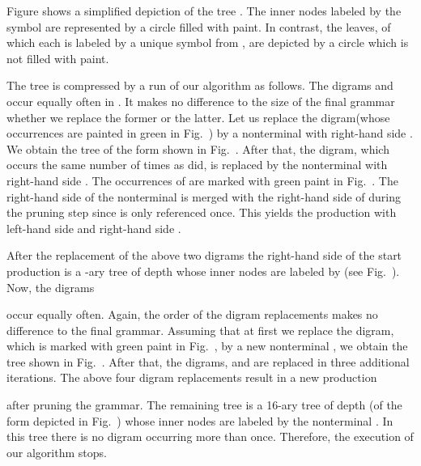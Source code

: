 \documentclass[12pt]{llncs}
\newcommand{\tp}{digram\xspace}
\newcommand{\tps}{digrams\xspace}
\begin{document}
\begin{example}\label{ex:unlimitedRank1}
	Figure  shows a simplified depiction of the tree . The inner nodes labeled by the symbol  are represented by a circle filled with paint. In contrast, the leaves, of which each is labeled by a unique symbol from , are depicted by a circle which is not filled with paint. 
	
	The tree  is compressed by a run of our algorithm as follows. The \tps  and  occur equally often in . It makes no difference to the size of the final grammar whether we replace the former or the latter. Let us replace the \tp  (whose occurrences are painted in green in Fig.~) by a nonterminal  with right-hand side . We obtain the tree of the form shown in Fig.~. After that, the \tp , which occurs the same number of times as  did, is replaced by the nonterminal  with right-hand side . The occurrences of  are marked with green paint in Fig.~. The right-hand side of the nonterminal  is merged with the right-hand side of  during the pruning step since  is only referenced once. This yields the production with left-hand side  and right-hand side . 
	
	After the replacement of the above two \tps the right-hand side of the start production is a -ary tree of depth  whose inner nodes are labeled by  (see Fig.~).
	Now, the \tps
	 
	occur equally often. Again, the order of the \tp replacements makes no difference to the final grammar. Assuming that at first we replace the \tp , which is marked with green paint in Fig.~, by a new nonterminal , we obtain the tree shown in Fig.~. After that, the \tps ,  and  are replaced in three additional iterations. The above four \tp replacements result in a new production
	
	after pruning the grammar. The remaining tree is a 16-ary tree of depth  (of the form depicted in Fig.~) whose inner nodes are labeled by the nonterminal . In this tree there is no \tp occurring more than once. Therefore, the execution of our algorithm stops.
\end{example}
\end{document}
